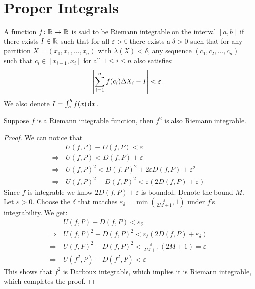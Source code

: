 \documentclass[11pt,a4paper]{article}
\begin{document}
	\maketitle


  \newpage
  \tableofcontents
	\newpage

  \section{Proper Integrals}
  \begin{definition}
    A function $f \colon \mathbb{R} \to \mathbb{R}$ is said to be Riemann integrable on the 
    interval $[a,b]$ if there exists $I \in \mathbb{R}$ such that for all 
    $\varepsilon > 0$ there exists a $\delta > 0$ such that 
    for any partition $X = (x_0,x_1,\dots,x_n)$ with $\lambda(X) < \delta$, 
    any sequence $(c_1,c_2,\ldots,c_n)$ such that $c_i \in[x_{i-1},x_i]$ for
    all $1 \le i \le n$ also satisfies:
    \[
      \abs{\sum_{i=1}^{n}{f(c_i)\Delta X_i} - I} < \varepsilon.
	  \]
    We also denote $I = \int_{a}^{b} f(x)\dx$.
  \end{definition}
  \begin{proposition}
	  Suppose $f$ is a Riemann integrable function,
    then $f^2$ is also Riemann integrable.
  \end{proposition}
  \begin{proof}
    We can notice that
    \begin{align*}
      &U(f,P) - D(f,P) < \varepsilon \\
      \Rightarrow\, &U(f,P) < D(f,P) + \varepsilon \\
      \Rightarrow\, &U(f,P)^2<D(f,P)^2 + 2\varepsilon D(f,P) + \varepsilon^2 \\
      \Rightarrow\, &U(f,P)^2 - D(f,P)^2 < \varepsilon (2D(f,P) + \varepsilon)
    \end{align*}	
    Since $f$ is integrable we know $2D(f,P) + \varepsilon$ is bounded.
    Denote the bound $M$.
    Let $\varepsilon > 0$.
    Choose the $\delta$ that matches 
    $\varepsilon_{\delta} = \min(\frac{\varepsilon}{2M+1},1)$ 
    under $f$'s integrability.
    We get:
      \begin{align*}
        &U(f,P) - D(f,P) < \varepsilon_{\delta} \\
        \Rightarrow\, &U(f,P)^2 - D(f,P)^2 <
          \varepsilon_{\delta} (2D(f,P) + \varepsilon_{\delta}) \\
        \Rightarrow\, &U(f,P)^2 - D(f,P)^2 <
          \frac{\varepsilon}{2M+1} (2M + 1) = \varepsilon \\
        \Rightarrow\, &U(f^2,P) - D(f^2,P) < \varepsilon
      \end{align*}	
    This shows that $f^2$ is Darboux integrable, which implies
    it is Riemann integrable, which completes the proof.
  \end{proof}
\end{document}

